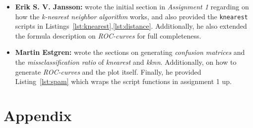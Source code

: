 \documentclass[a4paper, twocolumn]{article}
\begin{document}
    \begin{itemize}
        \item{\textbf{Erik S. V. Jansson:} wrote the initial section in \emph{Assignment 1} regarding on how the \emph{k-nearest neighbor algorithm} works, and also provided the \texttt{knearest} scripts in Listings~\ref{lst:knearest},\ref{lst:distance}. Additionally, he also extended the formula description on \emph{ROC-curves} for full completeness.}
        \item{\textbf{Martin Estgren:} wrote the sections on generating \emph{confusion matrices} and the \emph{missclassification ratio} of \emph{knearest} and \emph{kknn}. Additionally, on how to generate \emph{ROC-curves} and the plot itself. Finally, he provided Listing~\ref{lst:spam} which wraps the script functions in assignment 1 up.}
    \end{itemize}

    \nocite{*} %
    
    
    \onecolumn \appendix
    \section*{Appendix}

    
    
    
\end{document}
